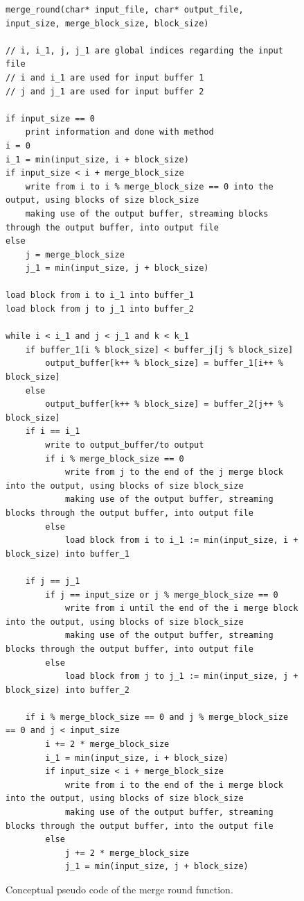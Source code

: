 \documentclass[twocolumn]{article}
\begin{document}
\begin{figure}
    \begin{center}
        \small
        \begin{lstlisting}
merge_round(char* input_file, char* output_file, input_size, merge_block_size, block_size)

// i, i_1, j, j_1 are global indices regarding the input file
// i and i_1 are used for input buffer 1
// j and j_1 are used for input buffer 2

if input_size == 0
    print information and done with method
i = 0
i_1 = min(input_size, i + block_size)
if input_size < i + merge_block_size 
    write from i to i % merge_block_size == 0 into the output, using blocks of size block_size
    making use of the output buffer, streaming blocks through the output buffer, into output file
else
    j = merge_block_size
    j_1 = min(input_size, j + block_size)

load block from i to i_1 into buffer_1
load block from j to j_1 into buffer_2

while i < i_1 and j < j_1 and k < k_1
    if buffer_1[i % block_size] < buffer_j[j % block_size]
        output_buffer[k++ % block_size] = buffer_1[i++ % block_size]
    else
        output_buffer[k++ % block_size] = buffer_2[j++ % block_size]
    if i == i_1
        write to output_buffer/to output
        if i % merge_block_size == 0
            write from j to the end of the j merge block into the output, using blocks of size block_size
            making use of the output buffer, streaming blocks through the output buffer, into output file 
        else
            load block from i to i_1 := min(input_size, i + block_size) into buffer_1
    
    if j == j_1
        if j == input_size or j % merge_block_size == 0
            write from i until the end of the i merge block into the output, using blocks of size block_size
            making use of the output buffer, streaming blocks through the output buffer, into output file 
        else
            load block from j to j_1 := min(input_size, j + block_size) into buffer_2
    
    if i % merge_block_size == 0 and j % merge_block_size == 0 and j < input_size
        i += 2 * merge_block_size
        i_1 = min(input_size, i + block_size)
        if input_size < i + merge_block_size 
            write from i to the end of the i merge block into the output, using blocks of size block_size
            making use of the output buffer, streaming blocks through the output buffer, into the output file
        else 
            j += 2 * merge_block_size
            j_1 = min(input_size, j + block_size)
\end{lstlisting}
        \normalsize
    \end{center}
    \caption{Conceptual pseudo code of the merge round function.}
    \label{fig:merge_round_pseudo_code}
\end{figure}
\end{document}

